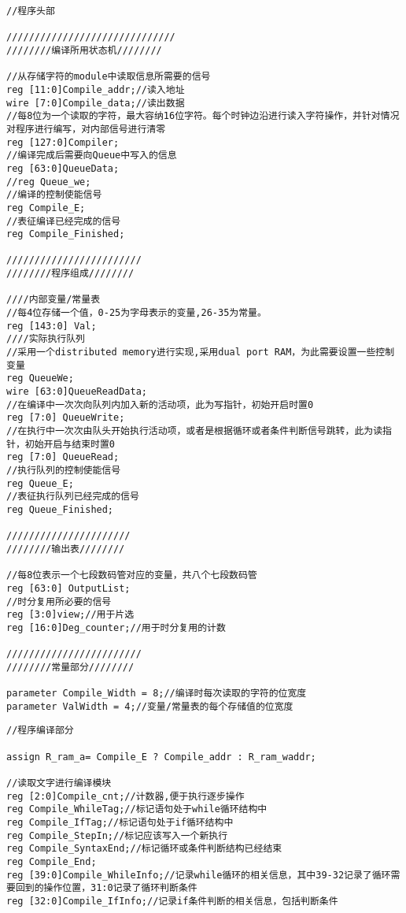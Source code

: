 \documentclass[lang=cn,11pt,a4paper]{elegantpaper}
\begin{document}
\begin{lstlisting}
//程序头部

//////////////////////////////
////////编译所用状态机////////

//从存储字符的module中读取信息所需要的信号
reg [11:0]Compile_addr;//读入地址
wire [7:0]Compile_data;//读出数据
//每8位为一个读取的字符，最大容纳16位字符。每个时钟边沿进行读入字符操作，并针对情况对程序进行编写，对内部信号进行清零
reg [127:0]Compiler;
//编译完成后需要向Queue中写入的信息
reg [63:0]QueueData;
//reg Queue_we;
//编译的控制使能信号
reg Compile_E;
//表征编译已经完成的信号
reg Compile_Finished;

////////////////////////
////////程序组成////////

////内部变量/常量表
//每4位存储一个值，0-25为字母表示的变量,26-35为常量。
reg [143:0] Val;
////实际执行队列
//采用一个distributed memory进行实现,采用dual port RAM，为此需要设置一些控制变量
reg QueueWe;
wire [63:0]QueueReadData;
//在编译中一次次向队列内加入新的活动项，此为写指针，初始开启时置0
reg [7:0] QueueWrite;
//在执行中一次次由队头开始执行活动项，或者是根据循环或者条件判断信号跳转，此为读指针，初始开启与结束时置0
reg [7:0] QueueRead;
//执行队列的控制使能信号
reg Queue_E;
//表征执行队列已经完成的信号
reg Queue_Finished;

//////////////////////
////////输出表////////

//每8位表示一个七段数码管对应的变量，共八个七段数码管
reg [63:0] OutputList;
//时分复用所必要的信号
reg [3:0]view;//用于片选
reg [16:0]Deg_counter;//用于时分复用的计数

////////////////////////
////////常量部分////////

parameter Compile_Width = 8;//编译时每次读取的字符的位宽度
parameter ValWidth = 4;//变量/常量表的每个存储值的位宽度

\end{lstlisting}

\begin{lstlisting}
//程序编译部分

assign R_ram_a= Compile_E ? Compile_addr : R_ram_waddr;

//读取文字进行编译模块
reg [2:0]Compile_cnt;//计数器,便于执行逐步操作
reg Compile_WhileTag;//标记语句处于while循环结构中
reg Compile_IfTag;//标记语句处于if循环结构中
reg Compile_StepIn;//标记应该写入一个新执行
reg Compile_SyntaxEnd;//标记循环或条件判断结构已经结束
reg Compile_End;
reg [39:0]Compile_WhileInfo;//记录while循环的相关信息，其中39-32记录了循环需要回到的操作位置，31:0记录了循环判断条件
reg [32:0]Compile_IfInfo;//记录if条件判断的相关信息，包括判断条件
\end{lstlisting}
\end{document}
